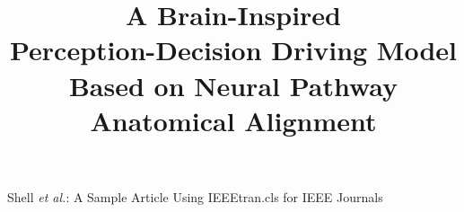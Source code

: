 \documentclass[lettersize,journal]{IEEEtran}
\begin{document}
\title{A Brain-Inspired \\ Perception-Decision Driving Model \\Based on Neural Pathway Anatomical Alignment}


%
{Shell \MakeLowercase{\textit{et al.}}: A Sample Article Using IEEEtran.cls for IEEE Journals}


\maketitle

    










\end{document}
